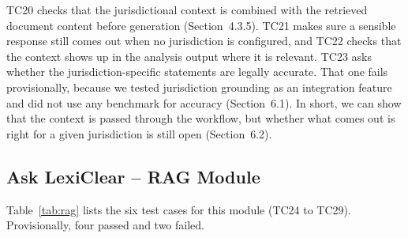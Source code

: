 \documentclass[12pt,a4paper,oneside]{report}
\begin{document}
TC20 checks that the jurisdictional context is combined with the retrieved document content before generation (Section~4.3.5). TC21 makes sure a sensible response still comes out when no jurisdiction is configured, and TC22 checks that the context shows up in the analysis output where it is relevant. TC23 asks whether the jurisdiction-specific statements are legally accurate. That one fails provisionally, because we tested jurisdiction grounding as an integration feature and did not use any benchmark for accuracy (Section~6.1). In short, we can show that the context is passed through the workflow, but whether what comes out is right for a given jurisdiction is still open (Section~6.2).

\subsection{Ask LexiClear -- RAG Module}
Table~\ref{tab:rag} lists the six test cases for this module (TC24 to TC29). Provisionally, four passed and two failed.
\end{document}
